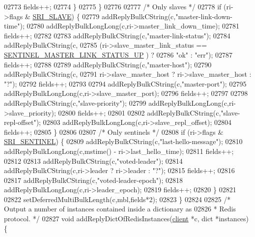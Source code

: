 \begin{DoxyCode}
{{{{{{{{{{{{{{{{{{{{{{{{{{{{{{{{{{{{{{{{{{{{{{{{{{{{{{{{{02773             fields++;
02774         \}
02775     \}
02776 
02777     \textcolor{comment}{/* Only slaves */}
02778     \textcolor{keywordflow}{if} (ri->flags & \hyperlink{sentinel_8c_a4b9db21eda79d49bd9fdf2cf7b3178e8}{SRI\_SLAVE}) \{
02779         addReplyBulkCString(c,\textcolor{stringliteral}{"master-link-down-time"});
02780         addReplyBulkLongLong(c,ri->master\_link\_down\_time);
02781         fields++;
02782 
02783         addReplyBulkCString(c,\textcolor{stringliteral}{"master-link-status"});
02784         addReplyBulkCString(c,
02785             (ri->slave\_master\_link\_status == \hyperlink{sentinel_8c_a8dc7f6cce8e6299e2422b8c65ca16418}{SENTINEL\_MASTER\_LINK\_STATUS\_UP}
      ) ?
02786             \textcolor{stringliteral}{"ok"} : \textcolor{stringliteral}{"err"});
02787         fields++;
02788 
02789         addReplyBulkCString(c,\textcolor{stringliteral}{"master-host"});
02790         addReplyBulkCString(c,
02791             ri->slave\_master\_host ? ri->slave\_master\_host : \textcolor{stringliteral}{"?"});
02792         fields++;
02793 
02794         addReplyBulkCString(c,\textcolor{stringliteral}{"master-port"});
02795         addReplyBulkLongLong(c,ri->slave\_master\_port);
02796         fields++;
02797 
02798         addReplyBulkCString(c,\textcolor{stringliteral}{"slave-priority"});
02799         addReplyBulkLongLong(c,ri->slave\_priority);
02800         fields++;
02801 
02802         addReplyBulkCString(c,\textcolor{stringliteral}{"slave-repl-offset"});
02803         addReplyBulkLongLong(c,ri->slave\_repl\_offset);
02804         fields++;
02805     \}
02806 
02807     \textcolor{comment}{/* Only sentinels */}
02808     \textcolor{keywordflow}{if} (ri->flags & \hyperlink{sentinel_8c_a8ed55207b2af5d2dd314c951ef253f64}{SRI\_SENTINEL}) \{
02809         addReplyBulkCString(c,\textcolor{stringliteral}{"last-hello-message"});
02810         addReplyBulkLongLong(c,mstime() - ri->last\_hello\_time);
02811         fields++;
02812 
02813         addReplyBulkCString(c,\textcolor{stringliteral}{"voted-leader"});
02814         addReplyBulkCString(c,ri->leader ? ri->leader : \textcolor{stringliteral}{"?"});
02815         fields++;
02816 
02817         addReplyBulkCString(c,\textcolor{stringliteral}{"voted-leader-epoch"});
02818         addReplyBulkLongLong(c,ri->leader\_epoch);
02819         fields++;
02820     \}
02821 
02822     setDeferredMultiBulkLength(c,mbl,fields*2);
02823 \}
02824 
02825 \textcolor{comment}{/* Output a number of instances contained inside a dictionary as}
02826 \textcolor{comment}{ * Redis protocol. */}
02827 \textcolor{keywordtype}{void} addReplyDictOfRedisInstances(\hyperlink{structclient}{client} *c, dict *instances) \{
}}}}}}}}}}}}}}}}}}}}}}}}}}}}}}}}}}}}}}}}}}}}}}}}}}}}}}}}}
\end{DoxyCode}
